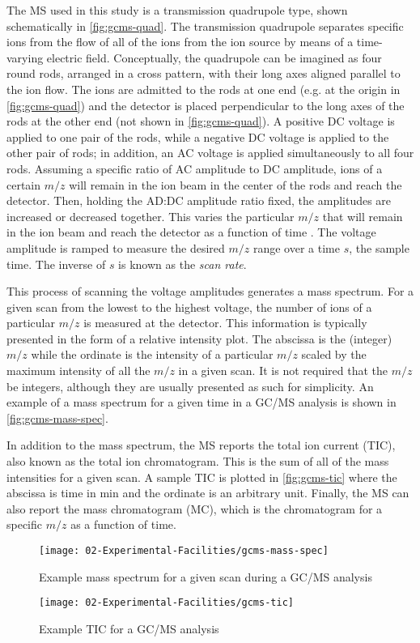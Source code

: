 \documentclass[../main.tex]{subfiles}
\begin{document}
The MS used in this study is a transmission quadrupole type, shown
schematically in \autoref{fig:gcms-quad}. The transmission quadrupole separates
specific ions from the flow of all of the ions from the ion source by
means of a time-varying electric field. Conceptually, the quadrupole
can be imagined as four round rods, arranged in a cross pattern, with
their long axes aligned parallel to the ion flow. The ions are admitted
to the rods at one end (e.g. at the origin in \autoref{fig:gcms-quad}) and
the detector is placed perpendicular to the long axes of the rods at
the other end (not shown in \autoref{fig:gcms-quad}). A positive DC voltage is applied
to one pair of the rods, while a negative DC voltage is applied to the other
pair of rods; in addition, an AC voltage is applied simultaneously to all four
rods. Assuming a specific ratio of AC amplitude to DC amplitude, ions of a certain
$m/z$ will remain in the ion beam in the center of the rods and reach the detector.
Then, holding the AD:DC amplitude ratio fixed, the amplitudes are increased or decreased
together. This varies the particular $m/z$ that will remain in the ion beam
and reach the detector as a function of time \cite{Sparkman2011}. The voltage amplitude is ramped
to measure the desired $m/z$ range over a time $s$, the sample time. The inverse of
$s$ is known as the \textit{scan rate}.

This process of scanning the voltage amplitudes generates a mass spectrum.
For a given scan from the lowest to the highest voltage, the number of ions
of a particular $m/z$ is measured at the detector. This information is
typically presented in the form of a relative intensity plot. The abscissa
is the (integer) $m/z$ while the ordinate is the intensity of a particular
$m/z$ scaled by the maximum intensity of all the $m/z$ in a given scan. It
is not required that the $m/z$ be integers, although they are usually presented
as such for simplicity. An example of a mass spectrum for a given time in a
GC/MS analysis is shown in \autoref{fig:gcms-mass-spec}.

In addition to the mass spectrum, the MS reports the total ion current (TIC),
also known as the total ion chromatogram. This is the sum of all of the mass
intensities for a given scan. A sample TIC is plotted in \autoref{fig:gcms-tic}
where the abscissa is time in \si{\minute} and the ordinate is an arbitrary unit.
Finally, the MS can also report the mass chromatogram (MC), which is the
chromatogram for a specific $m/z$ as a function of time.

\begin{figure}
    \begin{floatrow}
        \ffigbox
            {\texttt{[image: 02-Experimental-Facilities/gcms-mass-spec]}}
            {\caption{Example mass spectrum for a given scan during a GC/MS analysis}
            \label{fig:gcms-mass-spec}}
        \ffigbox
            {\texttt{[image: 02-Experimental-Facilities/gcms-tic]}}
            {\caption{Example TIC for a GC/MS analysis}
            \label{fig:gcms-tic}}
    \end{floatrow}
\end{figure}
\end{document}
